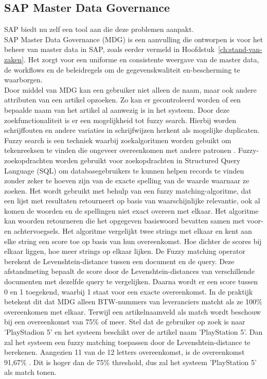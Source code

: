 \subsection{SAP Master Data Governance}
SAP biedt nu zelf een tool aan die deze problemen aanpakt. 
\\SAP Master Data Governance (MDG) is een aanvulling die ontworpen is voor het beheer van master data in SAP, zoals eerder vermeld in Hoofdstuk~\ref{ch:stand-van-zaken}. Het zorgt voor een uniforme en consistente weergave van de master data, de workflows en de beleidregels om de gegevenskwaliteit en-bescherming te waarborgen. 
\\Door middel van MDG kan een gebruiker niet alleen de naam, maar ook andere attributen van een artikel opzoeken. Zo kan er gecontroleerd worden of een bepaalde naam van het artikel al aanwezig is in het systeem. Door deze zoekfunctionaliteit is er een mogelijkheid tot fuzzy search. Hierbij worden schrijffouten en andere variaties in schrijfwijzen herkent als mogelijke duplicaten. 
\\Fuzzy search is een techniek waarbij zoekalgoritmen worden gebuikt om tekenreeksen te vinden die ongeveer overeenkomen met andere patronen \autocite{TechTarget2022}. Fuzzy-zoekopdrachten worden gebruikt voor zoekopdrachten in Structured Query Language (SQL) om databasegebruikers te kunnen helpen records te vinden zonder zeker te hoeven zijn van de exacte spelling van de waarde waarnaar ze zoeken. Het wordt gebruikt met behulp van een fuzzy matching-algoritme, dat een lijst met resultaten retourneert op basis van waarschijnlijke relevantie, ook al komen de woorden en de spellingen niet exact overeen met elkaar. Het algoritme kan woorden retourneren die het opgegeven basiswoord bevatten samen met voor- en achtervoegsels. Het algoritme vergelijkt twee strings met elkaar en kent aan elke string een score toe op basis van hun overeenkomst. Hoe dichter de scores bij elkaar liggen, hoe meer strings op elkaar lijken. De Fuzzy matching operator berekent de Levenshtein-distance tussen een document en de query. Deze afstandmeting bepaalt de score door de Levenshtein-distances van verschillende documenten met dezelfde query te vergelijken. Daarna wordt er een score tussen 0 en 1 toegekend, waarbij 1 staat voor een exacte overeenkomst. In de praktijk betekent dit dat MDG alleen BTW-nummers van leveranciers matcht als ze 100\% overeenkomen met elkaar. Terwijl een artikelnaamveld als match wordt beschouw bij een overeenkomst van 75\% of meer. Stel dat de gebruiker op zoek is naar 'PlayStadion 5' en het systeem beschikt over de artikel naam 'PlayStation 5'. Dan zal het systeem een fuzzy matching toepassen door de Levenshtein-distance te berekenen. Aangezien 11 van de 12 letters overeenkomst, is de overeenkomst 91,67\% \autocite{IBM}. Dit is hoger dan de 75\% threshold, dus zal het systeem 'PlayStation 5' als match tonen.
